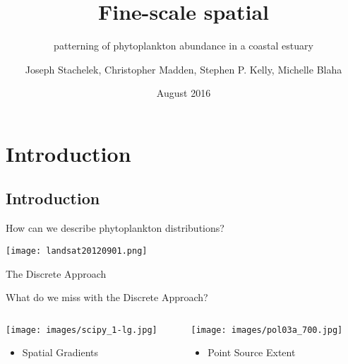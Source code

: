 \documentclass[compress,noflama,nosectionpages]{beamer}
\title{\nohyphens{Fine-scale spatial}}
\subtitle{\nohyphens{patterning of phytoplankton abundance in a coastal estuary}}
\date{August 2016}
\author{{\Medium Joseph Stachelek}, Christopher Madden, Stephen P. Kelly, Michelle Blaha}
\institute{South Florida Water Management District\\ {\Medium Everglades Division}}
\begin{document}

\maketitle



\section{Introduction}
\subsection{Introduction}
\begin{frame}{How can we describe phytoplankton distributions?}

\texttt{[image: landsat20120901.png]}\\

\end{frame}

\begin{frame}{The Discrete Approach}

\end{frame}

\begin{frame}{What do we miss with the Discrete Approach?}

	\begin{columns}
		\begin{column}[c]{5cm}
	  	\texttt{[image: images/scipy\_1-lg.jpg]}%
	  	\begin{itemize}
	  		\item{Spatial Gradients}
	  	\end{itemize}
		\end{column}
		\begin{column}{5cm}
			\texttt{[image: images/pol03a\_700.jpg]}%
			\begin{itemize}
	  		\item{Point Source Extent}
	  	\end{itemize}
		\end{column}
	\end{columns}
     
\end{frame}
\end{document}
